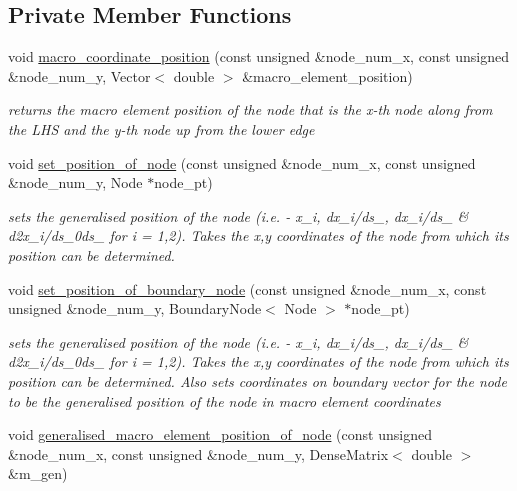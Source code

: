 \subsection*{Private Member Functions}
\begin{DoxyCompactItemize}
\item 
void \hyperlink{classoomph_1_1HermiteQuadMesh_a745a06530e60580e95826bedcf2e3e01}{macro\+\_\+coordinate\+\_\+position} (const unsigned \&node\+\_\+num\+\_\+x, const unsigned \&node\+\_\+num\+\_\+y, Vector$<$ double $>$ \&macro\+\_\+element\+\_\+position)
\begin{DoxyCompactList}\small\item\em returns the macro element position of the node that is the x-\/th node along from the L\+HS and the y-\/th node up from the lower edge \end{DoxyCompactList}\item 
void \hyperlink{classoomph_1_1HermiteQuadMesh_abaac1dedc4a2e578b73b0d849c9a68e8}{set\+\_\+position\+\_\+of\+\_\+node} (const unsigned \&node\+\_\+num\+\_\+x, const unsigned \&node\+\_\+num\+\_\+y, Node $\ast$node\+\_\+pt)
\begin{DoxyCompactList}\small\item\em sets the generalised position of the node (i.\+e. -\/ x\+\_\+i, dx\+\_\+i/ds\+\_, dx\+\_\+i/ds\+\_ \& d2x\+\_\+i/ds\+\_\+0ds\+\_ for i = 1,2). Takes the x,y coordinates of the node from which its position can be determined. \end{DoxyCompactList}\item 
void \hyperlink{classoomph_1_1HermiteQuadMesh_a735fd20f847ac98c5bd5db5196ff3ea4}{set\+\_\+position\+\_\+of\+\_\+boundary\+\_\+node} (const unsigned \&node\+\_\+num\+\_\+x, const unsigned \&node\+\_\+num\+\_\+y, Boundary\+Node$<$ Node $>$ $\ast$node\+\_\+pt)
\begin{DoxyCompactList}\small\item\em sets the generalised position of the node (i.\+e. -\/ x\+\_\+i, dx\+\_\+i/ds\+\_, dx\+\_\+i/ds\+\_ \& d2x\+\_\+i/ds\+\_\+0ds\+\_ for i = 1,2). Takes the x,y coordinates of the node from which its position can be determined. Also sets coordinates on boundary vector for the node to be the generalised position of the node in macro element coordinates \end{DoxyCompactList}\item 
void \hyperlink{classoomph_1_1HermiteQuadMesh_a17d8992ae7fa8b46b568d156306d3c89}{generalised\+\_\+macro\+\_\+element\+\_\+position\+\_\+of\+\_\+node} (const unsigned \&node\+\_\+num\+\_\+x, const unsigned \&node\+\_\+num\+\_\+y, Dense\+Matrix$<$ double $>$ \&m\+\_\+gen)

\end{DoxyCompactItemize}
